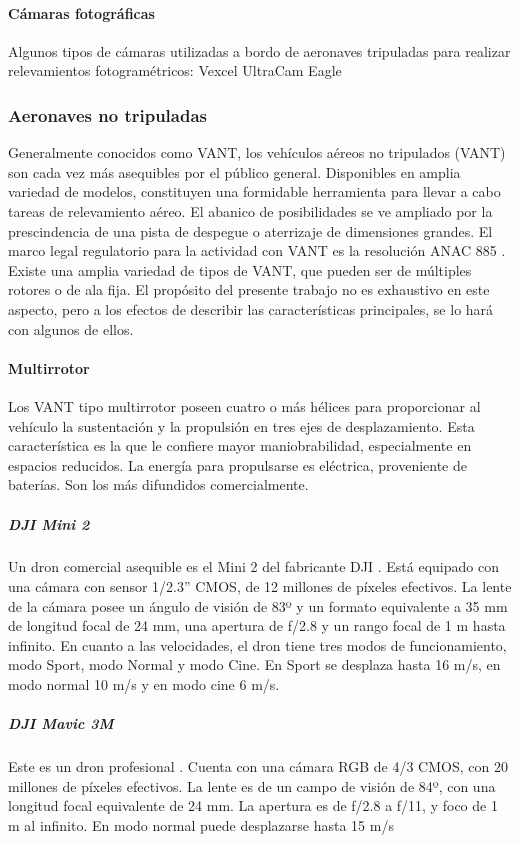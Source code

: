 \paragraph{Cámaras fotográficas}
Algunos tipos de cámaras utilizadas a bordo de aeronaves tripuladas para realizar relevamientos fotogramétricos:
Vexcel UltraCam Eagle

\subsubsection{Aeronaves no tripuladas}
Generalmente conocidos como VANT, los vehículos aéreos no tripulados (VANT) son cada vez más asequibles por el público general. Disponibles en amplia variedad de modelos, constituyen una formidable herramienta para llevar a cabo tareas de relevamiento aéreo. El abanico de posibilidades se ve ampliado por la prescindencia de una pista de despegue o aterrizaje de dimensiones grandes. El marco legal regulatorio para la actividad con VANT es la resolución ANAC 885 \cite{noauthor_infoleg_nodate}.
Existe una amplia variedad de tipos de VANT, que pueden ser de múltiples rotores o de ala fija. El propósito del presente trabajo no es exhaustivo en este aspecto, pero a los efectos de describir las características principales, se lo hará con algunos de ellos.
\paragraph{Multirrotor}
Los VANT tipo multirrotor poseen cuatro o más hélices para proporcionar al vehículo la sustentación y la propulsión en tres ejes de desplazamiento. Esta característica es la que le confiere mayor maniobrabilidad, especialmente en espacios reducidos. La energía para propulsarse es eléctrica, proveniente de baterías. Son los más difundidos comercialmente.
\subparagraph{DJI Mini 2}
Un dron comercial asequible es el Mini 2 del fabricante DJI \cite{noauthor_dji_nodate-1}. Está equipado con una cámara con sensor 1/2.3” CMOS, de 12 millones de píxeles efectivos. La lente de la cámara posee un ángulo de visión de 83º y un formato equivalente a 35 mm de longitud focal de 24 mm, una apertura de f/2.8 y un rango focal de 1 m hasta infinito. En cuanto a las velocidades, el dron tiene tres modos de funcionamiento, modo Sport, modo Normal y modo Cine. En Sport se desplaza hasta 16 m/s, en modo normal 10 m/s y en modo cine 6 m/s.
\subparagraph{DJI Mavic 3M}
Este es un dron profesional \cite{noauthor_dji_nodate}. Cuenta con una cámara RGB de 4/3 CMOS, con 20 millones de píxeles efectivos. La lente es de un campo de visión de 84º, con una longitud focal equivalente de 24 mm. La apertura es de f/2.8 a f/11, y foco de 1 m al infinito. En modo normal puede desplazarse hasta 15 m/s
